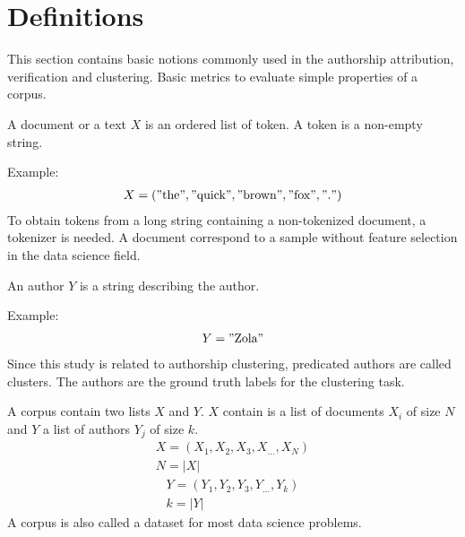 \section{Definitions \label{sec:definitions}}

This section contains basic notions commonly used in the authorship attribution, verification and clustering.
Basic metrics to evaluate simple properties of a corpus.

\begin{definition}
  A document or a text $X$ is an ordered list of token.
  A token is a non-empty string.

  Example:
  \begin{gather*}
    X = ("\text{the}", "\text{quick}", "\text{brown}", "\text{fox}", "\text{.}")
  \end{gather*}
  To obtain tokens from a long string containing a non-tokenized document, a tokenizer is needed.
  A document correspond to a sample without feature selection in the data science field.
\end{definition}

\begin{definition}[Author]
  An author $Y$ is a string describing the author.

  Example:
  \begin{gather*}
    Y = "\text{Zola}"
  \end{gather*}
  Since this study is related to authorship clustering, predicated authors are called clusters.
  The authors are the ground truth labels for the clustering task.
\end{definition}

\begin{definition}[Corpus]
  A corpus contain two lists $X$ and $Y$.
  $X$ contain is a list of documents $X_i$ of size $N$ and $Y$ a list of authors $Y_j$ of size $k$.
  \begin{gather*}
    X = (X_1, X_2, X_3, X_{...}, X_N) \\
    N = |X|
  \end{gather*}
  \begin{gather*}
    Y = (Y_1, Y_2, Y_3, Y_{...}, Y_k) \\
    k = |Y|
  \end{gather*}
  A corpus is also called a dataset for most data science problems.
\end{definition}

